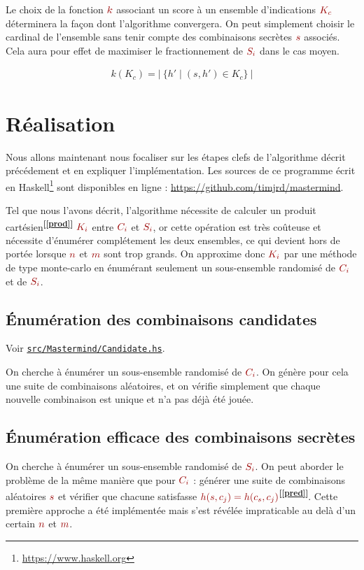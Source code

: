 \documentclass[a4paper]{article}
\renewcommand{\(}{\begin{math}\color{brick}}
\renewcommand{\)}{\end{math}}
\newcommand{\blockmath}[1]{{\color{brick}\begin{align*}#1\end{align*}}}
\renewcommand{\eqref}[1]{\color{brick}\textbf{[\ref{#1}]}}
\newcommand{\seqref}[1]{\textsuperscript{\eqref{#1}}}
\newcommand{\srcref}[1]{\href{https://github.com/timjrd/mastermind/blob/master/#1}{\texttt{#1}}}
\begin{document}
Le choix de la fonction \(k\) associant un score à un ensemble d'indications \(K_c\) déterminera la façon dont l'algorithme convergera. On peut simplement choisir le cardinal de l'ensemble sans tenir compte des combinaisons secrètes \(s\) associés. Cela aura pour effet de maximiser le fractionnement de \(S_i\) dans le cas moyen.

\blockmath{
  k(K_c) = | \ \{ h' \mid (s,h') \in K_c\} \ |
}


\section{Réalisation}
\label{random}

Nous allons maintenant nous focaliser sur les étapes clefs de l'algorithme décrit précédement et en expliquer l'implémentation. Les sources de ce programme écrit en Haskell\footnote{\url{https://www.haskell.org}} sont disponibles en ligne : \url{https://github.com/timjrd/mastermind}.

Tel que nous l'avons décrit, l'algorithme nécessite de calculer un produit cartésien\seqref{prod} \(K_i\) entre \(C_i\) et \(S_i\), or cette opération est très coûteuse et nécessite d'énumérer complétement les deux ensembles, ce qui devient hors de portée lorsque \(n\) et \(m\) sont trop grands. On approxime donc \(K_i\) par une méthode de type monte-carlo en énumérant seulement un sous-ensemble randomisé de \(C_i\) et de \(S_i\).

\subsection{Énumération des combinaisons candidates}

Voir \srcref{src/Mastermind/Candidate.hs}.

On cherche à énumérer un sous-ensemble randomisé de \(C_i\). On génère pour cela une suite de combinaisons aléatoires, et on vérifie simplement que chaque nouvelle combinaison est unique et n'a pas déjà été jouée.

\subsection{Énumération efficace des combinaisons secrètes}

On cherche à énumérer un sous-ensemble randomisé de \(S_i\). On peut aborder le problème de la même manière que pour \(C_i\) : générer une suite de combinaisons aléatoires \(s\) et vérifier que chacune satisfasse \(h(s,c_j) = h(c_s,c_j)\)\seqref{pred}. Cette première approche a été implémentée mais s'est révélée impraticable au delà d'un certain \(n\) et \(m\).
\end{document}
